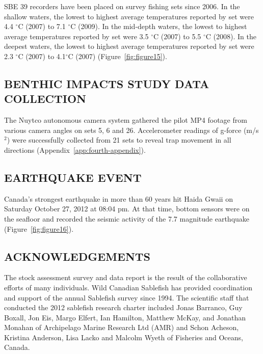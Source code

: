 \documentclass[12pt]{article}\usepackage[]{graphicx}\usepackage[]{color}
\begin{document}
SBE 39 recorders have been placed on survey fishing sets since 2006. In the shallow waters, the lowest to highest average temperatures reported by set were 4.4 \(^\circ\)C (2007) to 7.1 \(^\circ\)C (2009). In the mid-depth waters, the lowest to highest average temperatures reported by set were 3.5 \(^\circ\)C (2007) to 5.5 \(^\circ\)C (2008). In the deepest waters, the lowest to highest average temperatures reported by set were 2.3 \(^\circ\)C (2007) to 4.1\(^\circ\)C (2007) (Figure~\ref{fig:figure15}).

\hypertarget{benthic-impacts-study-data-collection}{%
\subsection{BENTHIC IMPACTS STUDY DATA COLLECTION}\label{benthic-impacts-study-data-collection}}

The Nuytco autonomous camera system gathered the pilot MP4 footage from various camera angles on sets 5, 6 and 26. Accelerometer readings of g-force (m/s\(^2\)) were successfully collected from 21 sets to reveal trap movement in all directions (Appendix~\ref{app:fourth-appendix}).

\hypertarget{earthquake-event}{%
\subsection{EARTHQUAKE EVENT}\label{earthquake-event}}

Canada's strongest earthquake in more than 60 years hit Haida Gwaii on Saturday October 27, 2012 at 08:04 pm. At that time, bottom sensors were on the seafloor and recorded the seismic activity of the 7.7 magnitude earthquake (Figure~\ref{fig:figure16}).

\hypertarget{acknowledgements}{%
\subsection{ACKNOWLEDGEMENTS}\label{acknowledgements}}

The stock assessment survey and data report is the result of the collaborative efforts of many individuals. Wild Canadian Sablefish has provided coordination and support of the annual Sablefish survey since 1994. The scientific staff that conducted the 2012 sablefish research charter included Jonas Barranco, Guy Boxall, Jon Eis, Margo Elfert, Ian Hamilton, Matthew McKay, and Jonathan Monahan of Archipelago Marine Research Ltd (AMR) and Schon Acheson, Kristina Anderson, Lisa Lacko and Malcolm Wyeth of Fisheries and Oceans, Canada.
\end{document}
